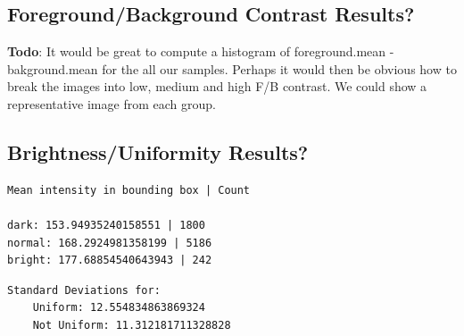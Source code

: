 \documentclass[conference]{IEEEtran}
\begin{document}
\subsection{Foreground/Background Contrast Results?}
\textbf{Todo}: It would be great to compute a histogram of foreground.mean -
bakground.mean for the all our samples.
Perhaps it would then be obvious how to break the images into low, medium
and high F/B contrast.  We could show a representative image from each
group.

\subsection{Brightness/Uniformity Results?}
\begin{verbatim}
Mean intensity in bounding box | Count

dark: 153.94935240158551 | 1800
normal: 168.2924981358199 | 5186
bright: 177.68854540643943 | 242
\end{verbatim}
\begin{verbatim}
Standard Deviations for:
    Uniform: 12.554834863869324
    Not Uniform: 11.312181711328828
\end{verbatim}
\end{document}
